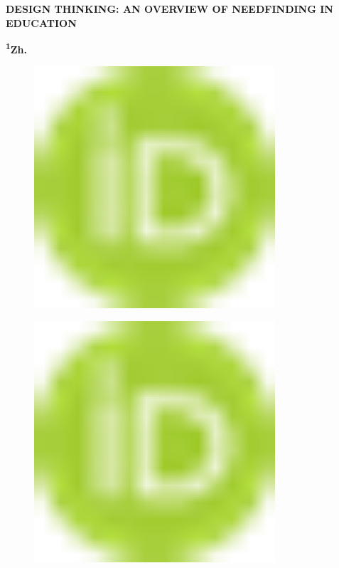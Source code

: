 
{\bfseries DESIGN THINKING: AN OVERVIEW OF NEEDFINDING IN EDUCATION}

{\bfseries \textsuperscript{1}Zh.}
\begin{figure}[H]
	\centering
	\includegraphics[width=0.8\textwidth]{media/ekon2/image1}
	\caption*{}
\end{figure}

\begin{figure}[H]
	\centering
	\includegraphics[width=0.8\textwidth]{media/ekon2/image1}
	\caption*{}
\end{figure}


